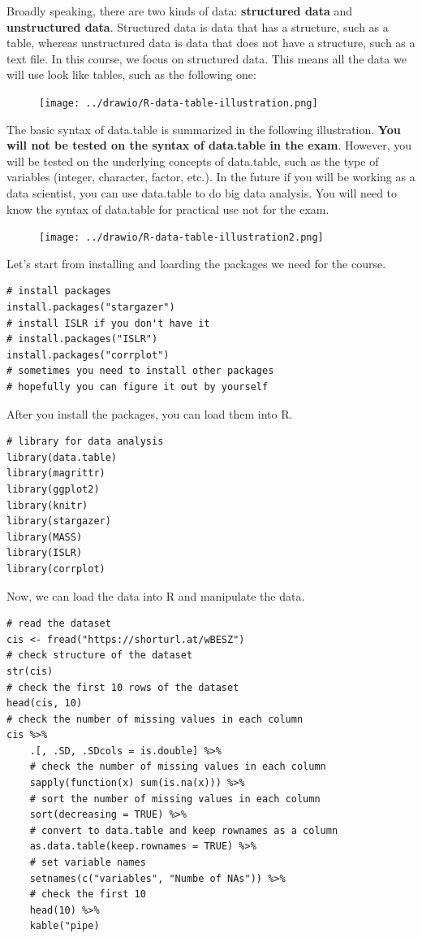 \documentclass[11pt]{article}
\theoremstyle{definition}
\begin{document}
Broadly speaking, there are two kinds of data: \textbf{structured data} and 
\textbf{unstructured data}. 
Structured data is data that has a structure, such as a table, 
whereas unstructured data is data that does not have a structure, 
such as a text file. In this course, we focus on structured data. 
This means all the data we will use look like tables, such as the following one:


\begin{figure}
  \centering
  \texttt{[image: ../drawio/R-data-table-illustration.png]}
\end{figure}


The basic syntax of data.table is summarized in the following illustration. 
\textbf{You will not be tested on the syntax of data.table in the exam}. However, 
you will be tested on the underlying concepts of data.table, such as the
type of variables (integer, character, factor, etc.). In the future if
you will be working as a data scientist, you can use data.table to do 
big data analysis. You will need to know the syntax of data.table for 
practical use not for the exam.


\begin{figure}
    \centering
    \texttt{[image: ../drawio/R-data-table-illustration2.png]}
\end{figure}

Let's start from installing and loarding the packages we need for the course.

\lstset{language=R}   

\begin{lstlisting}
# install packages
install.packages("stargazer")
# install ISLR if you don't have it
# install.packages("ISLR")
install.packages("corrplot")
# sometimes you need to install other packages
# hopefully you can figure it out by yourself
\end{lstlisting}

After you install the packages, you can load them into R.

\begin{lstlisting}
# library for data analysis
library(data.table)
library(magrittr)
library(ggplot2)
library(knitr)
library(stargazer)
library(MASS)
library(ISLR)
library(corrplot)
\end{lstlisting}

Now, we can load the data into R and manipulate the data.

\begin{lstlisting}
# read the dataset
cis <- fread("https://shorturl.at/wBESZ")
# check structure of the dataset
str(cis)
# check the first 10 rows of the dataset
head(cis, 10)
# check the number of missing values in each column
cis %>%
    .[, .SD, .SDcols = is.double] %>%
    # check the number of missing values in each column
    sapply(function(x) sum(is.na(x))) %>%
    # sort the number of missing values in each column
    sort(decreasing = TRUE) %>%
    # convert to data.table and keep rownames as a column
    as.data.table(keep.rownames = TRUE) %>%
    # set variable names
    setnames(c("variables", "Numbe of NAs")) %>%
    # check the first 10 
    head(10) %>%
    kable("pipe)
\end{lstlisting}
\end{document}
